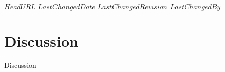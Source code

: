 \svnidlong
{$HeadURL$}
{$LastChangedDate$}
{$LastChangedRevision$}
{$LastChangedBy$}
\section{Discussion}
Discussion